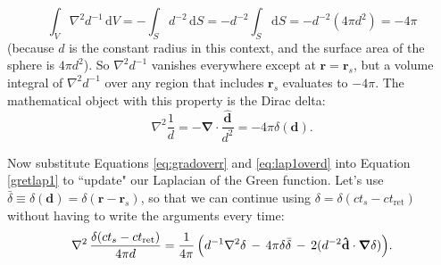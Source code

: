 \documentclass[12pt]{article}
\renewcommand{\vv}[1]{\mathbf{#1}}
\newcommand{\dd}[1]{\mathrm{d}#1}
\newcommand{\del}{\boldsymbol{\nabla}}
\begin{document}
\begin{equation*}
\int_V \nabla^2 d^{-1} \, \dd V = - \int_S d^{-2} \, \dd S = - d^{-2} \int_S \dd S = - d^{-2} \left( 4 \pi d^2 \right) = - 4 \pi 
\end{equation*}
(because $d$ is the constant radius in this context, and the surface area of the sphere is $4 \pi d^2$). So $\nabla^2 d^{-1}$ vanishes everywhere except at $\vv r = \vv r_{s}$, but a volume integral of $\nabla^2 d^{-1}$ over any region that includes $\vv r_{s}$ evaluates to $- 4 \pi$. The mathematical object with this property is the Dirac delta:
\begin{equation}\label{eq:lap1overd}
\nabla^2 \dfrac{1}{d} = - \del \cdot \dfrac{\vv{\hat{d}}}{d^2} = - 4 \pi \delta(\vv d).
\end{equation}

Now substitute Equations \ref{eq:gradoverr} and \ref{eq:lap1overd} into Equation \ref{gretlap1} to ``update" our Laplacian of the Green function. Let's use $\bar{\delta} \equiv \delta(\vv d) = \delta(\vv r - \vv r_{s})$, so that we can continue using $\delta = \delta (ct_{s} - ct_{\textrm{ret}})$ without having to write the arguments every time:
\begin{equation}\label{gretlap2}
\nabla^2 \, \dfrac{\delta ( ct_{s} - ct_{\textrm{ret}} )}{4 \pi d} = \dfrac{1}{4 \pi} \, \Bigl( d^{-1} \nabla^2 \delta \, - \, 4 \pi \delta \bar{\delta} \, - \, 2 (d^{-2} \vv{\hat{d}} \cdot \del \delta) \Bigr) .
\end{equation}
\end{document}
